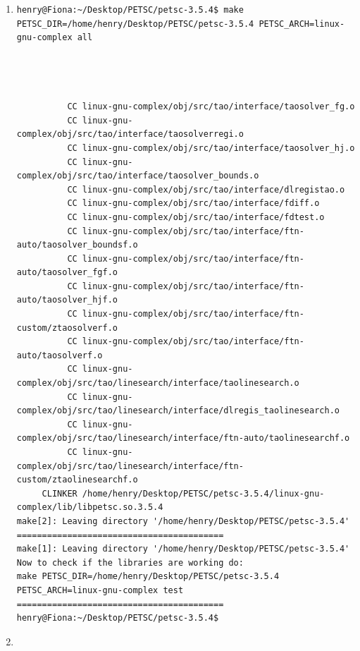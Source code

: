 \documentclass{article}
\begin{document}
\begin{enumerate}
\item 
\tiny
\begin{verbatim}
henry@Fiona:~/Desktop/PETSC/petsc-3.5.4$ make PETSC_DIR=/home/henry/Desktop/PETSC/petsc-3.5.4 PETSC_ARCH=linux-gnu-complex all   




          CC linux-gnu-complex/obj/src/tao/interface/taosolver_fg.o
          CC linux-gnu-complex/obj/src/tao/interface/taosolverregi.o
          CC linux-gnu-complex/obj/src/tao/interface/taosolver_hj.o
          CC linux-gnu-complex/obj/src/tao/interface/taosolver_bounds.o
          CC linux-gnu-complex/obj/src/tao/interface/dlregistao.o
          CC linux-gnu-complex/obj/src/tao/interface/fdiff.o
          CC linux-gnu-complex/obj/src/tao/interface/fdtest.o
          CC linux-gnu-complex/obj/src/tao/interface/ftn-auto/taosolver_boundsf.o
          CC linux-gnu-complex/obj/src/tao/interface/ftn-auto/taosolver_fgf.o
          CC linux-gnu-complex/obj/src/tao/interface/ftn-auto/taosolver_hjf.o
          CC linux-gnu-complex/obj/src/tao/interface/ftn-custom/ztaosolverf.o
          CC linux-gnu-complex/obj/src/tao/interface/ftn-auto/taosolverf.o
          CC linux-gnu-complex/obj/src/tao/linesearch/interface/taolinesearch.o
          CC linux-gnu-complex/obj/src/tao/linesearch/interface/dlregis_taolinesearch.o
          CC linux-gnu-complex/obj/src/tao/linesearch/interface/ftn-auto/taolinesearchf.o
          CC linux-gnu-complex/obj/src/tao/linesearch/interface/ftn-custom/ztaolinesearchf.o
     CLINKER /home/henry/Desktop/PETSC/petsc-3.5.4/linux-gnu-complex/lib/libpetsc.so.3.5.4
make[2]: Leaving directory '/home/henry/Desktop/PETSC/petsc-3.5.4'
=========================================
make[1]: Leaving directory '/home/henry/Desktop/PETSC/petsc-3.5.4'
Now to check if the libraries are working do:
make PETSC_DIR=/home/henry/Desktop/PETSC/petsc-3.5.4 PETSC_ARCH=linux-gnu-complex test
=========================================
henry@Fiona:~/Desktop/PETSC/petsc-3.5.4$
\end{verbatim}
\normalsize
\item 
\tiny
\begin{verbatim}


\end{verbatim}
\end{enumerate}
\end{document}
